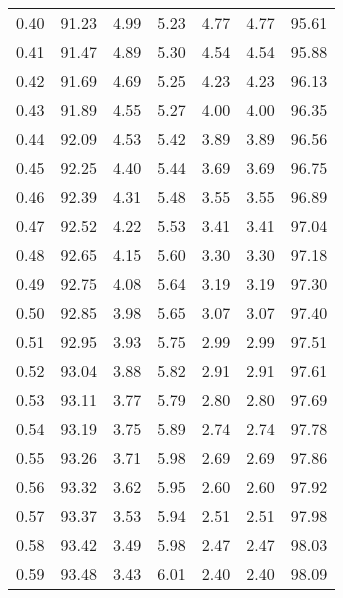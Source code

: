 \begin{tabular}{|c|c|c|c|c|c|c|}
      0.40 &     91.23 &      4.99 &       5.23 &    4.77 &       4.77 &         95.61 \\
      0.41 &     91.47 &      4.89 &       5.30 &    4.54 &       4.54 &         95.88 \\
      0.42 &     91.69 &      4.69 &       5.25 &    4.23 &       4.23 &         96.13 \\
      0.43 &     91.89 &      4.55 &       5.27 &    4.00 &       4.00 &         96.35 \\
      0.44 &     92.09 &      4.53 &       5.42 &    3.89 &       3.89 &         96.56 \\
      0.45 &     92.25 &      4.40 &       5.44 &    3.69 &       3.69 &         96.75 \\
      0.46 &     92.39 &      4.31 &       5.48 &    3.55 &       3.55 &         96.89 \\
      0.47 &     92.52 &      4.22 &       5.53 &    3.41 &       3.41 &         97.04 \\
      0.48 &     92.65 &      4.15 &       5.60 &    3.30 &       3.30 &         97.18 \\
      0.49 &     92.75 &      4.08 &       5.64 &    3.19 &       3.19 &         97.30 \\
      0.50 &     92.85 &      3.98 &       5.65 &    3.07 &       3.07 &         97.40 \\
      0.51 &     92.95 &      3.93 &       5.75 &    2.99 &       2.99 &         97.51 \\
      0.52 &     93.04 &      3.88 &       5.82 &    2.91 &       2.91 &         97.61 \\
      0.53 &     93.11 &      3.77 &       5.79 &    2.80 &       2.80 &         97.69 \\
      0.54 &     93.19 &      3.75 &       5.89 &    2.74 &       2.74 &         97.78 \\
      0.55 &     93.26 &      3.71 &       5.98 &    2.69 &       2.69 &         97.86 \\
      0.56 &     93.32 &      3.62 &       5.95 &    2.60 &       2.60 &         97.92 \\
      0.57 &     93.37 &      3.53 &       5.94 &    2.51 &       2.51 &         97.98 \\
      0.58 &     93.42 &      3.49 &       5.98 &    2.47 &       2.47 &         98.03 \\
      0.59 &     93.48 &      3.43 &       6.01 &    2.40 &       2.40 &         98.09 \\

\end{tabular}
